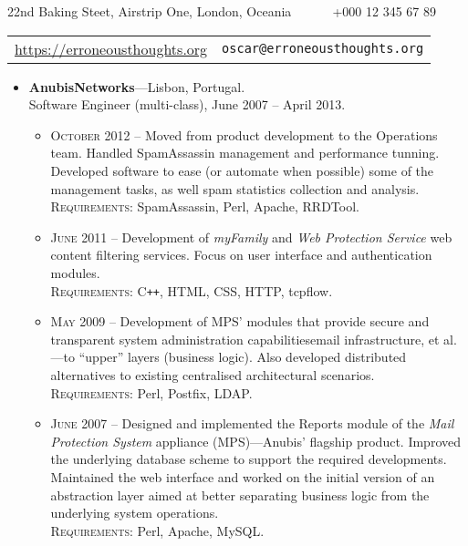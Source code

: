 \documentclass[a4paper,9pt]{extarticle}
\newenvironment{topic}[1]
   {{\noindent\large\bfseries\raisebox{0pt}[\height][1ex]{#1}\hrule}%
    \begin{list}{}{%
       \setlength{\leftmargin}{.0cm}}%
    \item[]}
   {\end{list}\medskip}
\newenvironment{header}[1]
   {\centering{\noindent\large\bfseries\raisebox{0pt}[\height][1ex]{\LARGE\bfseries #1}\hrule}%
    \begin{center}}
   {\end{center}\medskip}
\begin{document}
\begin{header}
  {Óscar Francisco Godinho Pereira} 
  { 22nd Baking Steet, Airstrip One, London, Oceania \verb+     + \Telefon +000 12 345 67 89 }\\[5pt]
  \begin{tabular}{l|r}
    \url{https://erroneousthoughts.org} & \texttt{oscar@erroneousthoughts.org} 
  \end{tabular}
\end{header}

\begin{topic}{Professional Experience}
  \begin{itemize}[leftmargin=*]
    \item {\bfseries AnubisNetworks}---Lisbon, Portugal.\\
      Software Engineer (multi-class), June 2007 -- April 2013.
      \begin{itemize}
	\item {\scshape October 2012} -- Moved from product development to the Operations team. Handled 
	  SpamAssassin management and performance tunning. Developed software to 
	  ease (or automate when possible) some of the management tasks, as well spam 
	  statistics collection and analysis.\\
	  {\scshape Requirements}: SpamAssassin, Perl, Apache, RRDTool.
	\item {\scshape June 2011} -- Development of \emph{myFamily} and \emph{Web Protection Service} 
	  web content filtering services. Focus on user interface and authentication modules.\\
	  {\scshape Requirements}: C{}\verb!++!, HTML, CSS, HTTP, tcpflow.
	\item {\scshape May 2009} -- Development of MPS' modules that provide secure and transparent 
	  system administration capabilities\textemdash email infrastructure, et al.---to 
	  ``upper'' layers (business logic). Also developed distributed 
	  alternatives to existing centralised architectural scenarios.\\
	  {\scshape Requirements}: Perl, Postfix, LDAP.
	\item {\scshape June 2007} -- Designed and implemented the Reports module of the \emph{Mail 
	  Protection System}\textsuperscript{\texttrademark} appliance 
	  (MPS)---Anubis' flagship product. Improved the underlying database 
	  scheme to support the required developments. Maintained the web 
	  interface and worked on the initial version of an abstraction layer 
	  aimed at better separating business logic from the underlying system 
	  operations.\\
	  {\scshape Requirements}: Perl, Apache, MySQL.
      \end{itemize}
  \end{itemize}
\end{topic}
\end{document}
